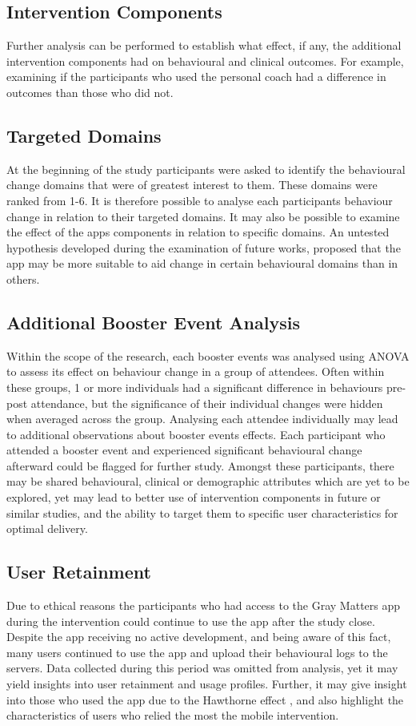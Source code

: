 \subsection{Intervention Components}
Further analysis can be performed to establish what effect, if any, the additional intervention components had on behavioural and clinical outcomes. For example, examining if the participants who used the personal coach had a difference in outcomes than those who did not.

\subsection{Targeted Domains}
At the beginning of the study participants were asked to identify the behavioural change domains that were of greatest interest to them. These domains were ranked from 1-6. It is therefore possible to analyse each participants behaviour change in relation to their targeted domains. It may also be possible to examine the effect of the apps components in relation to specific domains. An untested hypothesis developed during the examination of future works, proposed that the app may be more suitable to aid change in certain behavioural domains than in others.

\subsection{Additional Booster Event Analysis}
Within the scope of the research, each booster events was analysed using ANOVA to assess its effect on behaviour change in a group of attendees. Often within these groups, 1 or more individuals had a significant difference in behaviours pre-post attendance, but the significance of their individual changes were hidden when averaged across the group.
Analysing each attendee individually may lead to additional observations about booster events effects. Each participant who attended a booster event and experienced significant behavioural change afterward could be flagged for further study. Amongst these participants, there may be shared behavioural, clinical or demographic attributes which are yet to be explored, yet may lead to better use of intervention components in future or similar studies, and the ability to target them to specific user characteristics for optimal delivery.

\subsection{User Retainment}
Due to ethical reasons the participants who had access to the Gray Matters app during the intervention could continue to use the app after the study close. Despite the app receiving no active development, and being aware of this fact, many users continued to use the app and upload their behavioural logs to the servers. Data collected during this period was omitted from analysis, yet it may yield insights into user retainment and usage profiles. Further, it may give insight into those who used the app due to the Hawthorne effect \cite{McCarney2007}, and also highlight the characteristics of users who relied the most the mobile intervention.

